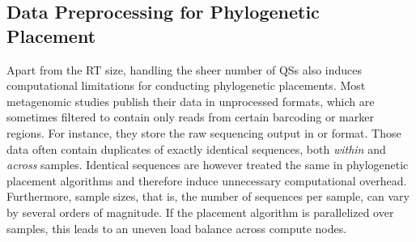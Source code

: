 
\subsection{Data Preprocessing for Phylogenetic Placement}
\label{ch:AutomaticTrees:sec:Methods:sub:DataPreprocessing}

Apart from the \ac{RT} size, handling the sheer number of \acp{QS}
also induces computational limitations for conducting phylogenetic placements.
Most metagenomic studies publish their data in unprocessed formats,
which are sometimes filtered to contain only reads from certain barcoding or marker regions.
For instance, they store the raw sequencing output in  \citep{Pearson1988} or  \citep{Cock2009} format.
Those data often contain duplicates of exactly identical sequences, both {\em within} and {\em across} samples.
Identical sequences are however treated the same in phylogenetic placement algorithms
and therefore induce unnecessary computational overhead.
Furthermore, sample sizes, that is, the number of sequences per sample, can vary by several orders of magnitude.
If the placement algorithm is parallelized over samples, this leads to an uneven load balance across compute nodes.

